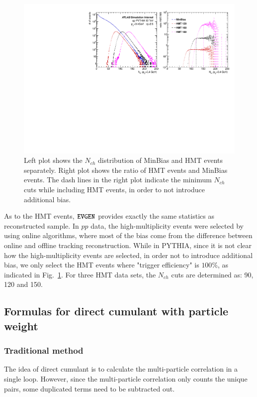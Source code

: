 \begin{figure}[H]
\centering
\includegraphics[width=.9\linewidth]{figs/sec_evtSlc/mon_pythia_truth_trkDis.pdf}
\caption{Left plot shows the $N_{ch}$ distribution of MinBias and HMT events separately. Right plot shows the ratio of HMT events and MinBias events. The dash lines in the right plot indicate the minimum $N_{ch}$ cuts while including HMT events, in order to not introduce additional bias.}
\label{fig:mon_pythia_truth_trkDis}
\end{figure}
As to the HMT events, $\verb|EVGEN|$ provides exactly the same statistics as reconstructed sample. In $pp$ data, the high-multiplicity events were selected by using online algorithms, where most of the bias come from the difference between online and offline tracking reconstruction. While in PYTHIA, since it is not clear how the high-multiplicity events are selected, in order not to introduce additional bias, we only select the HMT events where "trigger efficiency" is $100\%$, as indicated in Fig.~\ref{fig:mon_pythia_truth_trkDis}. For three HMT data sets, the $N_{ch}$ cuts are determined as: 90, 120 and 150.



\subsection{Formulas for direct cumulant with particle weight}

\subsubsection{Traditional method}
The idea of direct cumulant is to calculate the multi-particle correlation in a single loop. However, since the multi-particle correlation only counts the unique pairs, some duplicated terms need to be subtracted out.

